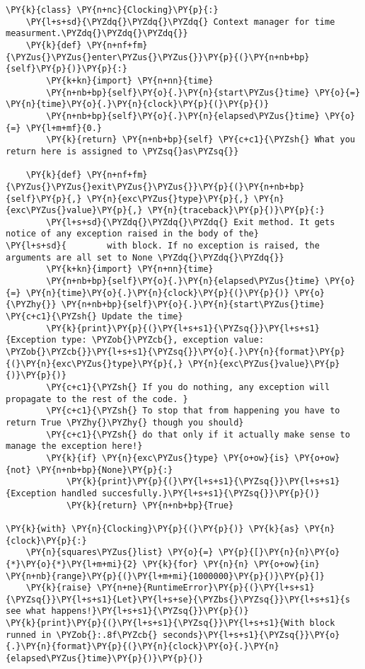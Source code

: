 \begin{Verbatim}[label=\makebox{\url{https://github.com/lucabaldini/cmepda/tree/master/slides/latex/snippets/context\_manager.py}},commandchars=\\\{\}]
\PY{k}{class} \PY{n+nc}{Clocking}\PY{p}{:}
    \PY{l+s+sd}{\PYZdq{}\PYZdq{}\PYZdq{} Context manager for time measurment.\PYZdq{}\PYZdq{}\PYZdq{}}
    \PY{k}{def} \PY{n+nf+fm}{\PYZus{}\PYZus{}enter\PYZus{}\PYZus{}}\PY{p}{(}\PY{n+nb+bp}{self}\PY{p}{)}\PY{p}{:}
        \PY{k+kn}{import} \PY{n+nn}{time}
        \PY{n+nb+bp}{self}\PY{o}{.}\PY{n}{start\PYZus{}time} \PY{o}{=} \PY{n}{time}\PY{o}{.}\PY{n}{clock}\PY{p}{(}\PY{p}{)}
        \PY{n+nb+bp}{self}\PY{o}{.}\PY{n}{elapsed\PYZus{}time} \PY{o}{=} \PY{l+m+mf}{0.}
        \PY{k}{return} \PY{n+nb+bp}{self} \PY{c+c1}{\PYZsh{} What you return here is assigned to \PYZsq{}as\PYZsq{}}
    
    \PY{k}{def} \PY{n+nf+fm}{\PYZus{}\PYZus{}exit\PYZus{}\PYZus{}}\PY{p}{(}\PY{n+nb+bp}{self}\PY{p}{,} \PY{n}{exc\PYZus{}type}\PY{p}{,} \PY{n}{exc\PYZus{}value}\PY{p}{,} \PY{n}{traceback}\PY{p}{)}\PY{p}{:}
        \PY{l+s+sd}{\PYZdq{}\PYZdq{}\PYZdq{} Exit method. It gets notice of any exception raised in the body of the}
\PY{l+s+sd}{        with block. If no exception is raised, the arguments are all set to None \PYZdq{}\PYZdq{}\PYZdq{}}
        \PY{k+kn}{import} \PY{n+nn}{time}
        \PY{n+nb+bp}{self}\PY{o}{.}\PY{n}{elapsed\PYZus{}time} \PY{o}{=} \PY{n}{time}\PY{o}{.}\PY{n}{clock}\PY{p}{(}\PY{p}{)} \PY{o}{\PYZhy{}} \PY{n+nb+bp}{self}\PY{o}{.}\PY{n}{start\PYZus{}time} \PY{c+c1}{\PYZsh{} Update the time}
        \PY{k}{print}\PY{p}{(}\PY{l+s+s1}{\PYZsq{}}\PY{l+s+s1}{Exception type: \PYZob{}\PYZcb{}, exception value: \PYZob{}\PYZcb{}}\PY{l+s+s1}{\PYZsq{}}\PY{o}{.}\PY{n}{format}\PY{p}{(}\PY{n}{exc\PYZus{}type}\PY{p}{,} \PY{n}{exc\PYZus{}value}\PY{p}{)}\PY{p}{)}
        \PY{c+c1}{\PYZsh{} If you do nothing, any exception will propagate to the rest of the code. }
        \PY{c+c1}{\PYZsh{} To stop that from happening you have to return True \PYZhy{}\PYZhy{} though you should}
        \PY{c+c1}{\PYZsh{} do that only if it actually make sense to manage the exception here!}
        \PY{k}{if} \PY{n}{exc\PYZus{}type} \PY{o+ow}{is} \PY{o+ow}{not} \PY{n+nb+bp}{None}\PY{p}{:}
            \PY{k}{print}\PY{p}{(}\PY{l+s+s1}{\PYZsq{}}\PY{l+s+s1}{Exception handled succesfully.}\PY{l+s+s1}{\PYZsq{}}\PY{p}{)}
            \PY{k}{return} \PY{n+nb+bp}{True}
        
\PY{k}{with} \PY{n}{Clocking}\PY{p}{(}\PY{p}{)} \PY{k}{as} \PY{n}{clock}\PY{p}{:}
    \PY{n}{squares\PYZus{}list} \PY{o}{=} \PY{p}{[}\PY{n}{n}\PY{o}{*}\PY{o}{*}\PY{l+m+mi}{2} \PY{k}{for} \PY{n}{n} \PY{o+ow}{in} \PY{n+nb}{range}\PY{p}{(}\PY{l+m+mi}{1000000}\PY{p}{)}\PY{p}{]}
    \PY{k}{raise} \PY{n+ne}{RuntimeError}\PY{p}{(}\PY{l+s+s1}{\PYZsq{}}\PY{l+s+s1}{Let}\PY{l+s+se}{\PYZbs{}\PYZsq{}}\PY{l+s+s1}{s see what happens!}\PY{l+s+s1}{\PYZsq{}}\PY{p}{)}
\PY{k}{print}\PY{p}{(}\PY{l+s+s1}{\PYZsq{}}\PY{l+s+s1}{With block runned in \PYZob{}:.8f\PYZcb{} seconds}\PY{l+s+s1}{\PYZsq{}}\PY{o}{.}\PY{n}{format}\PY{p}{(}\PY{n}{clock}\PY{o}{.}\PY{n}{elapsed\PYZus{}time}\PY{p}{)}\PY{p}{)}


\end{Verbatim}
